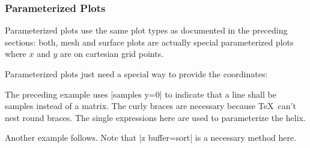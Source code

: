 \subsubsection{Parameterized Plots}
Parameterized plots use the same plot types as documented in the preceding sections: both, mesh and surface plots are actually special parameterized plots where $x$ and $y$ are on cartesian grid points.

Parameterized plots just need a special way to provide the coordinates:

\pgfplotsexpensiveexample
\begin{codeexample}[]
\end{codeexample}
\noindent The preceding example uses |samples y=0| to indicate that a line shall be samples instead of a matrix. The curly braces are necessary because \TeX\ can't nest round braces. The single expressions here are used to parameterize the helix.

Another example follows. Note that |z buffer=sort| is a necessary method here.

\pgfplotsexpensiveexample
\begin{codeexample}[]
\end{codeexample}

\pgfplotsexpensiveexample
\begin{codeexample}[]
\end{codeexample}

